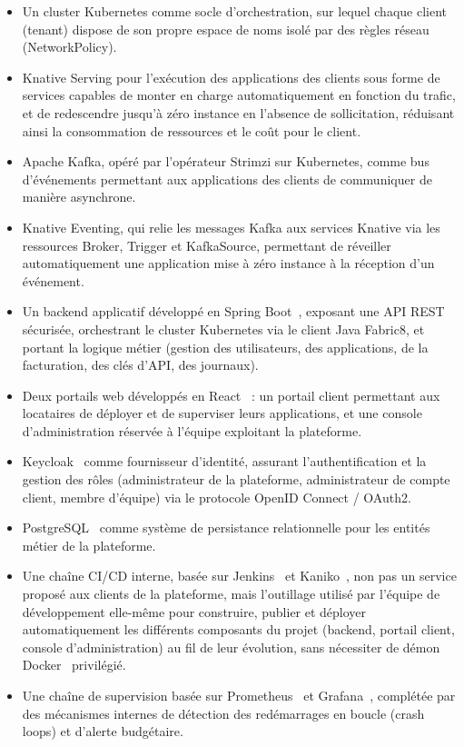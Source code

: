\begin{itemize}
    \item Un cluster Kubernetes comme socle d'orchestration, sur lequel chaque client (tenant) dispose de son propre espace de noms isolé par des règles réseau (NetworkPolicy).
    \item Knative Serving pour l'exécution des applications des clients sous forme de services capables de monter en charge automatiquement en fonction du trafic, et de redescendre jusqu'à zéro instance en l'absence de sollicitation, réduisant ainsi la consommation de ressources et le coût pour le client.
    \item Apache Kafka, opéré par l'opérateur Strimzi sur Kubernetes, comme bus d'événements permettant aux applications des clients de communiquer de manière asynchrone.
    \item Knative Eventing, qui relie les messages Kafka aux services Knative via les ressources Broker, Trigger et KafkaSource, permettant de réveiller automatiquement une application mise à zéro instance à la réception d'un événement.
    \item Un backend applicatif développé en Spring Boot~\cite{SpringBootDoc}, exposant une API REST sécurisée, orchestrant le cluster Kubernetes via le client Java Fabric8, et portant la logique métier (gestion des utilisateurs, des applications, de la facturation, des clés d'API, des journaux).
    \item Deux portails web développés en React~\cite{ReactDoc} : un portail client permettant aux locataires de déployer et de superviser leurs applications, et une console d'administration réservée à l'équipe exploitant la plateforme.
    \item Keycloak~\cite{KeycloakDoc} comme fournisseur d'identité, assurant l'authentification et la gestion des rôles (administrateur de la plateforme, administrateur de compte client, membre d'équipe) via le protocole OpenID Connect / OAuth2.
    \item PostgreSQL~\cite{PostgreSQLDoc} comme système de persistance relationnelle pour les entités métier de la plateforme.
    \item Une chaîne CI/CD interne, basée sur Jenkins~\cite{JenkinsDoc} et Kaniko~\cite{KanikoDoc}, non pas un service proposé aux clients de la plateforme, mais l'outillage utilisé par l'équipe de développement elle-même pour construire, publier et déployer automatiquement les différents composants du projet (backend, portail client, console d'administration) au fil de leur évolution, sans nécessiter de démon Docker~\cite{DockerDoc} privilégié.
    \item Une chaîne de supervision basée sur Prometheus~\cite{PrometheusDoc} et Grafana~\cite{GrafanaDoc}, complétée par des mécanismes internes de détection des redémarrages en boucle (crash loops) et d'alerte budgétaire.
\end{itemize}

